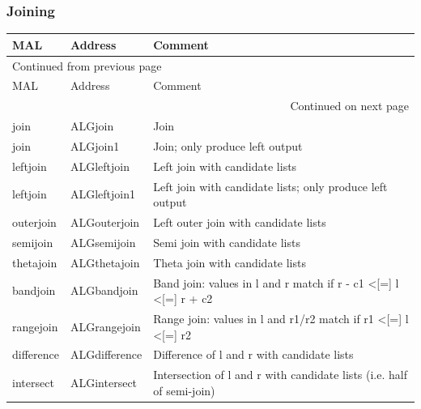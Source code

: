\documentclass[11pt]{article}
\begin{document}
\subsubsection{Joining}
\label{sec:org616022d}
\begin{longtable}{|l|l|p{10cm}|}
\hline
MAL & Address & Comment\\
\hline
\endfirsthead
\multicolumn{3}{l}{Continued from previous page} \\
\hline

MAL & Address & Comment \\

\hline
\endhead
\hline\multicolumn{3}{r}{Continued on next page} \\
\endfoot
\endlastfoot
\hline
join & ALGjoin & Join\\
\hline
join & ALGjoin1 & Join; only produce left output\\
\hline
leftjoin & ALGleftjoin & Left join with candidate lists\\
\hline
leftjoin & ALGleftjoin1 & Left join with candidate lists; only produce left output\\
\hline
outerjoin & ALGouterjoin & Left outer join with candidate lists\\
\hline
semijoin & ALGsemijoin & Semi join with candidate lists\\
\hline
thetajoin & ALGthetajoin & Theta join with candidate lists\\
\hline
bandjoin & ALGbandjoin & Band join: values in l and r match if r - c1 <[=] l <[=] r + c2\\
\hline
rangejoin & ALGrangejoin & Range join: values in l and r1/r2 match if r1 <[=] l <[=] r2\\
\hline
difference & ALGdifference & Difference of l and r with candidate lists\\
\hline
intersect & ALGintersect & Intersection of l and r with candidate lists (i.e. half of semi-join)\\
\hline
\end{longtable}
\end{document}
